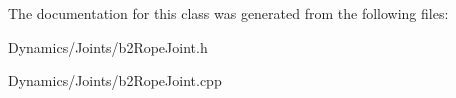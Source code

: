 The documentation for this class was generated from the following files\+:\begin{DoxyCompactItemize}
\item 
Dynamics/\+Joints/b2\+Rope\+Joint.\+h\item 
Dynamics/\+Joints/b2\+Rope\+Joint.\+cpp\end{DoxyCompactItemize}
